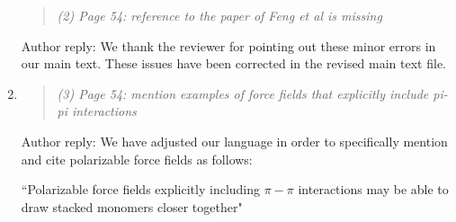 \documentclass{article}
\begin{document}
\begin{enumerate}
\begin{quote}
    \textit{(2) Page 54: reference to the paper of Feng et al is missing}

	\end{quote}
    
    Author reply: We thank the reviewer for pointing out these minor errors in our main text. These issues have been corrected in
    the revised main text file. %
    
    \item \begin{quote} \textit{(3) Page 54: mention examples of force fields that explicitly include pi-pi interactions
    } \end{quote}
    
    Author reply: We have adjusted our language in order to specifically mention and cite polarizable force fields as follows: 
    
    ``Polarizable force fields explicitly including $\pi-\pi$ interactions may be able to draw stacked
    monomers closer together"

\end{enumerate}
\end{document}
